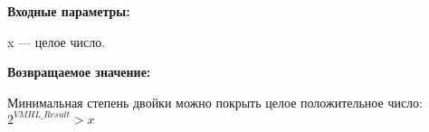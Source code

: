 \textbf{Входные параметры:}  
 
x --- целое число.

\textbf{Возвращаемое значение:}
 
 Минимальная степень двойки можно покрыть целое положительное число: $2^{VMHL\_Result}>x$